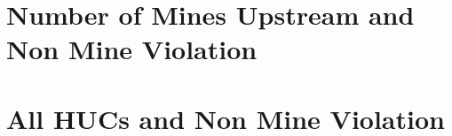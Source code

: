 \documentclass{beamer}
\begin{document}
\begin{frame}{}

\end{frame}

\section{Number of Mines Upstream and Non Mine Violation}

\begin{frame}{}

\end{frame}

\begin{frame}{}

\end{frame}

\begin{frame}{}

\end{frame}

\begin{frame}{}

\end{frame}

\begin{frame}{}

\end{frame}

\section{All HUCs and Non Mine Violation}

\begin{frame}{}

\end{frame}

\begin{frame}{}

\end{frame}

\begin{frame}{}

\end{frame}

\begin{frame}{}

\end{frame}
\end{document}
